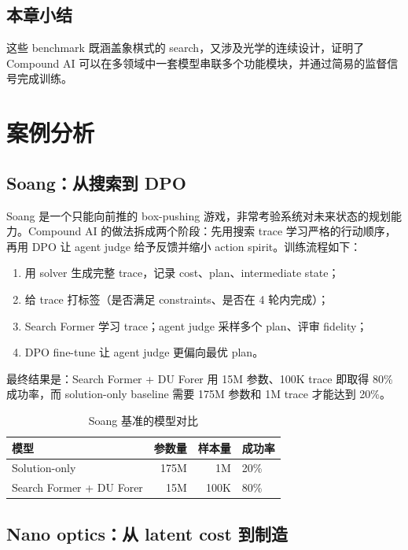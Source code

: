 \documentclass[a4paper]{article}
\begin{document}
\subsection{本章小结}

这些 benchmark 既涵盖象棋式的 search，又涉及光学的连续设计，证明了 Compound AI 可以在多领域中一套模型串联多个功能模块，并通过简易的监督信号完成训练。

\section{案例分析}

\subsection{Soang：从搜索到 DPO}

Soang 是一个只能向前推的 box-pushing 游戏，非常考验系统对未来状态的规划能力。Compound AI 的做法拆成两个阶段：先用搜索 trace 学习严格的行动顺序，再用 DPO 让 agent judge 给予反馈并缩小 action spirit。训练流程如下：
\begin{enumerate}
    \item 用 solver 生成完整 trace，记录 cost、plan、intermediate state；
    \item 给 trace 打标签（是否满足 constraints、是否在 4 轮内完成）；
    \item Search Former 学习 trace；agent judge 采样多个 plan、评审 fidelity；
    \item DPO fine-tune 让 agent judge 更偏向最优 plan。
\end{enumerate}
最终结果是：Search Former + DU Forer 用 15M 参数、100K trace 即取得 80\% 成功率，而 solution-only baseline 需要 175M 参数和 1M trace 才能达到 20\%。
\begin{table}[H]
\centering
\begin{tabular}{lrrl}
\toprule
模型 & 参数量 & 样本量 & 成功率 \\
\midrule
Solution-only & 175M & 1M & 20\% \\
Search Former + DU Forer & 15M & 100K & 80\% \\
\bottomrule
\end{tabular}
\caption{Soang 基准的模型对比}
\end{table}

\subsection{Nano optics：从 latent cost 到制造}
\end{document}
